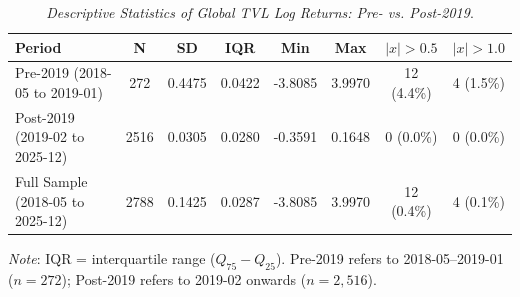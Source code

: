 \begin{table}[h]
  \centering
  \caption{\textit{Descriptive Statistics of Global TVL Log Returns: Pre- vs. Post-2019}.}
  \label{tab:tvldescstats20182025}
  \begin{tabular}{lccccccc}
    \toprule
    \textbf{Period} & \textbf{N} & \textbf{SD} & \textbf{IQR} & \textbf{Min} & \textbf{Max} & \textbf{$|x|>0.5$} & \textbf{$|x|>1.0$} \\ 
    \midrule
    Pre-2019 (2018-05 to 2019-01) & 272 & 0.4475 & 0.0422 & -3.8085 & 3.9970 & 12 (4.4\%) & 4 (1.5\%) \\ 
    Post-2019 (2019-02 to 2025-12) & 2516 & 0.0305 & 0.0280 & -0.3591 & 0.1648 & 0 (0.0\%) & 0 (0.0\%) \\ 
    Full Sample (2018-05 to 2025-12) & 2788 & 0.1425 & 0.0287 & -3.8085 & 3.9970 & 12 (0.4\%) & 4 (0.1\%) \\ 
    \bottomrule
  \end{tabular}
  \vspace{2pt}
  \footnotesize{\textit{Note}: IQR = interquartile range ($Q_{75}-Q_{25}$). Pre-2019 refers to 2018-05--2019-01 ($n=272$); Post-2019 refers to 2019-02 onwards ($n=2{,}516$).}\\
\end{table}